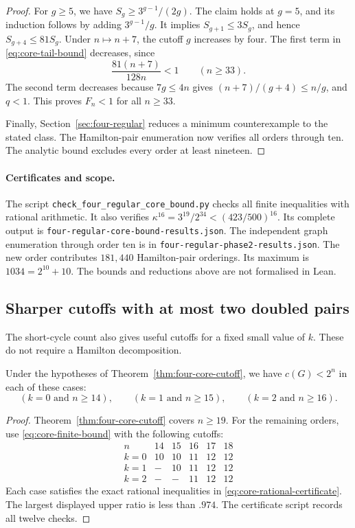 \begin{proof}
For $g\ge5$, we have $S_g\ge3^{g-1}/(2g)$.
The claim holds at $g=5$, and its induction follows by adding $3^{g-1}/g$.
It implies $S_{g+1}\le3S_g$, and hence $S_{g+4}\le81S_g$.
Under $n\mapsto n+7$, the cutoff $g$ increases by four.
The first term in \eqref{eq:core-tail-bound} decreases, since
\[
 \frac{81(n+7)}{128n}<1\qquad(n\ge33).
\]
The second term decreases because $7g\le4n$ gives $(n+7)/(g+4)\le n/g$, and $q<1$.
This proves $F_n<1$ for all $n\ge33$.

Finally, Section~\ref{sec:four-regular} reduces a minimum counterexample to the stated class.
The Hamilton-pair enumeration now verifies all orders through ten.
The analytic bound excludes every order at least nineteen.
\end{proof}

\paragraph{Certificates and scope.}
The script \texttt{check\_four\_regular\_core\_bound.py} checks all finite inequalities with rational arithmetic.
It also verifies $\kappa^{16}=3^{19}/2^{34}<(423/500)^{16}$.
Its complete output is \texttt{four-regular-core-bound-results.json}.
The independent graph enumeration through order ten is in \texttt{four-regular-phase2-results.json}.
The new order contributes $181{,}440$ Hamilton-pair orderings.
Its maximum is $1034=2^{10}+10$.
The bounds and reductions above are not formalised in Lean.


\subsection{Sharper cutoffs with at most two doubled pairs}

The short-cycle count also gives useful cutoffs for a fixed small value of $k$.
These do not require a Hamilton decomposition.

\begin{corollary}\label{cor:small-matching-cutoffs}
Under the hypotheses of Theorem~\ref{thm:four-core-cutoff}, we have $c(G)<2^n$ in each of these cases:
\[
 (k=0\text{ and }n\ge14),\qquad
 (k=1\text{ and }n\ge15),\qquad
 (k=2\text{ and }n\ge16).
\]
\end{corollary}

\begin{proof}
Theorem~\ref{thm:four-core-cutoff} covers $n\ge19$.
For the remaining orders, use \eqref{eq:core-finite-bound} with the following cutoffs:
\[
\begin{array}{c|ccccc}
 n&14&15&16&17&18\\\hline
 k=0&10&10&11&12&12\\
 k=1&-&10&11&12&12\\
 k=2&-&-&11&12&12
\end{array}
\]
Each case satisfies the exact rational inequalities in \eqref{eq:core-rational-certificate}.
The largest displayed upper ratio is less than $.974$.
The certificate script records all twelve checks.
\end{proof}

